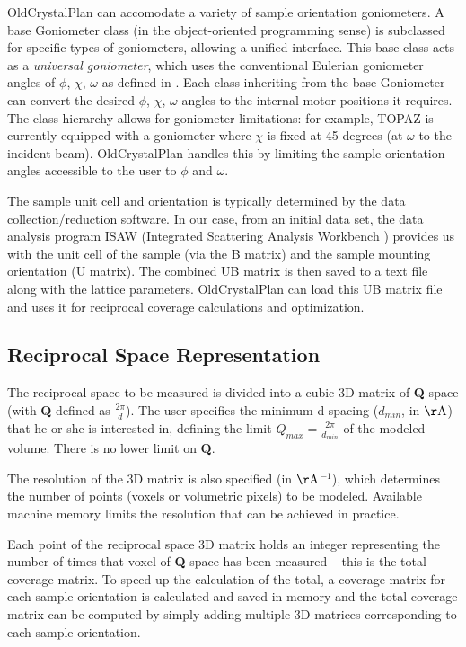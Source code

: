 \documentclass[final]{iucr}              %
\newcommand{\ang}{$\mathrm{\AA} $}
\begin{document}
OldCrystalPlan can accomodate a variety of sample
orientation goniometers. A base Goniometer class (in the object-oriented
programming sense) is subclassed for specific types of goniometers, allowing a
unified interface. This base class acts as a \emph{universal goniometer},
which uses the conventional Eulerian goniometer angles of
$\phi$, $\chi$, $\omega$ as defined in \cite{busing67}.
Each class inheriting from the base Goniometer can convert
the desired $\phi$, $\chi$, $\omega$ angles to the internal motor positions it requires. 
The class hierarchy allows for goniometer limitations: for example, TOPAZ is
currently equipped with a goniometer where $\chi$ is fixed at 45 degrees
(at $\omega$ to the incident beam). OldCrystalPlan handles this by limiting the
sample orientation angles accessible to the user to $\phi$ and $\omega$.
    
The sample unit cell and orientation is typically determined by the data
collection/reduction software. In our case, from an initial data set, the data
analysis program ISAW (Integrated Scattering Analysis
Workbench \cite{Mikkelson05}) provides us with the unit cell of the sample (via
the B matrix) and the sample mounting orientation (U matrix).
The combined UB matrix is then saved to a
text file along with the lattice parameters. 
OldCrystalPlan can load this UB matrix file and uses it for reciprocal coverage
calculations and optimization.
    
  
\subsection{Reciprocal Space Representation}

The reciprocal space to be measured is divided into a cubic 3D matrix 
of {\bf Q}-space (with {\bf Q} defined as $\frac{2\pi}{d}$). 
The user specifies the minimum d-spacing ($d_{min}$, in \ang) 
that he or she is interested in, defining the limit
$Q_{max} = \frac{2\pi}{d_{min}}$ of the modeled volume. There is no lower limit
on {\bf Q}.

The resolution of the 3D matrix is also specified
(in \ang$^{-1}$), which determines the number of points (voxels or volumetric pixels) to be modeled. Available machine memory
limits the resolution that can be achieved in practice.

Each point of the reciprocal space 3D matrix holds an integer representing the 
number of times that voxel of {\bf Q}-space has
been measured -- this is the total coverage matrix. To speed up the
calculation of the total, a coverage matrix for each sample orientation is 
calculated and saved in memory and the total coverage
matrix can be computed by simply adding multiple 3D matrices corresponding to each sample orientation. 
 
\end{document}
